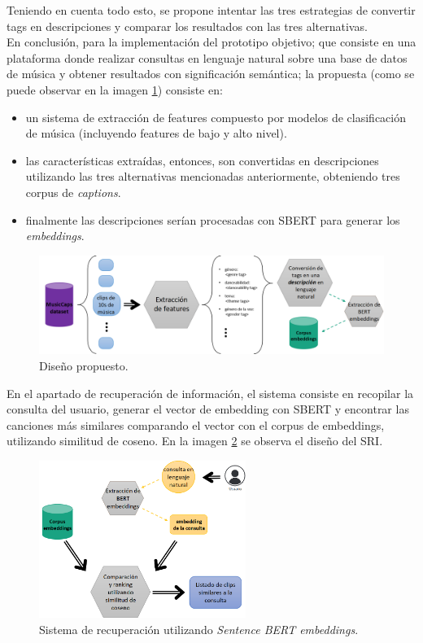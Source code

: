 Teniendo en cuenta todo esto, se propone intentar las tres estrategias de convertir tags en descripciones y comparar los resultados con las tres alternativas.\\

En conclusión, para la implementación del prototipo objetivo; que consiste en una plataforma donde realizar consultas en lenguaje natural sobre una base de datos de música y obtener resultados con significación semántica; la propuesta (como se puede observar en la imagen \ref{fig:corpus_embeddings}) consiste en:

\begin{itemize}
    \item un sistema de extracción de features compuesto por modelos de clasificación de música (incluyendo features de bajo y alto nivel).
    \item las características extraídas, entonces, son convertidas en descripciones utilizando las tres alternativas mencionadas anteriormente, obteniendo tres corpus de \textit{captions}.
    \item finalmente las descripciones serían procesadas con SBERT para generar los \textit{embeddings}.
\end{itemize}

\begin{figure}[h!]
	\centering
	\includegraphics[width=\textwidth]{Graphics/corpus_embeddings.png}
	\caption{Diseño propuesto.} 
    \label{fig:corpus_embeddings}
\end{figure}

En el apartado de recuperación de información, el sistema consiste en recopilar la consulta del usuario, generar el vector de embedding con SBERT y encontrar las canciones más similares comparando el vector con el corpus de embeddings, utilizando similitud de coseno. En la imagen \ref{fig:sri_design} se observa el diseño del SRI. %

\begin{figure}[h!]
	\centering
	\includegraphics[width=0.6\textwidth]{Graphics/SRI.png}
	\caption{Sistema de recuperación utilizando \textit{Sentence BERT embeddings}.} 
    \label{fig:sri_design}
\end{figure}

